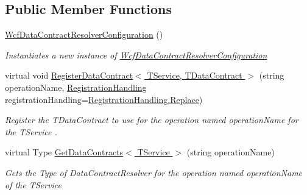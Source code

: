 \subsection*{Public Member Functions}
\begin{DoxyCompactItemize}
\item 
\hyperlink{classCqrs_1_1Services_1_1WcfDataContractResolverConfiguration_ac6853a244c867a60a64a223f6bcb6a55_ac6853a244c867a60a64a223f6bcb6a55}{Wcf\+Data\+Contract\+Resolver\+Configuration} ()
\begin{DoxyCompactList}\small\item\em Instantiates a new instance of \hyperlink{classCqrs_1_1Services_1_1WcfDataContractResolverConfiguration}{Wcf\+Data\+Contract\+Resolver\+Configuration} \end{DoxyCompactList}\item 
virtual void \hyperlink{classCqrs_1_1Services_1_1WcfDataContractResolverConfiguration_aac76dda08a5dc83bb006d1c2ac0f0180_aac76dda08a5dc83bb006d1c2ac0f0180}{Register\+Data\+Contract$<$ T\+Service, T\+Data\+Contract $>$} (string operation\+Name, \hyperlink{classCqrs_1_1Services_1_1WcfDataContractResolverConfiguration_acf6a145eb88c5d98b31a541cfb1fb152_acf6a145eb88c5d98b31a541cfb1fb152}{Registration\+Handling} registration\+Handling=\hyperlink{classCqrs_1_1Services_1_1WcfDataContractResolverConfiguration_acf6a145eb88c5d98b31a541cfb1fb152_acf6a145eb88c5d98b31a541cfb1fb152a0ebe6df8a3ac338e0512acc741823fdb}{Registration\+Handling.\+Replace})
\begin{DoxyCompactList}\small\item\em Register the {\itshape T\+Data\+Contract}  to use for the operation named {\itshape operation\+Name}  for the {\itshape T\+Service} . \end{DoxyCompactList}\item 
virtual Type \hyperlink{classCqrs_1_1Services_1_1WcfDataContractResolverConfiguration_a7e9e65b16d8f64da60e160ce60628e90_a7e9e65b16d8f64da60e160ce60628e90}{Get\+Data\+Contracts$<$ T\+Service $>$} (string operation\+Name)
\begin{DoxyCompactList}\small\item\em Gets the Type of Data\+Contract\+Resolver for the operation named {\itshape operation\+Name}  of the {\itshape T\+Service}  \end{DoxyCompactList}\end{DoxyCompactItemize}
